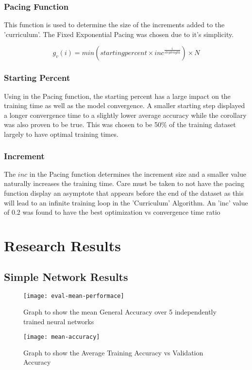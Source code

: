 \documentclass[conference]{IEEEtran}
\begin{document}
\subsubsection{Pacing Function}
This function is used to determine the size of the increments added to the 'curriculum'. The Fixed Exponential Pacing was chosen due to it's simplicity.

\begin{equation}
	g_v(i) = min(starting percent\times inc^{\frac{i}{step length}})\times N
\end{equation}

\subsubsection{Starting Percent}
Using in the Pacing function, the starting percent has a large impact on the training time as well as the model convergence. A smaller starting step displayed a longer convergence time to a slightly lower average accuracy while the corollary was also proven to be true. This was chosen to be 50\% of the training dataset largely to have optimal training times.

\subsubsection{Increment}
The $inc$ in the Pacing function determines the increment size and a smaller value naturally increases the training time. Care must be taken to not have the pacing function display an asymptote that appears before the end of the dataset as this will lead to an infinite training loop in the 'Curriculum' Algorithm. An 'inc' value of 0.2 was found to have the best optimization vs convergence time ratio

\section{Research Results}
\subsection{Simple Network Results}
\begin{figure}
	\caption{Graph to show the mean General Accuracy over 5 independently trained neural networks}
	\texttt{[image: eval-mean-performace]}
	\centering
	\label{fig:eval-mean}
\end{figure}

\begin{figure}
	\caption{Graph to show the Average Training Accuracy vs Validation Accuracy}
	\texttt{[image: mean-accuracy]}
	\centering
	\label{fig:mean-acc}
\end{figure}
\end{document}
